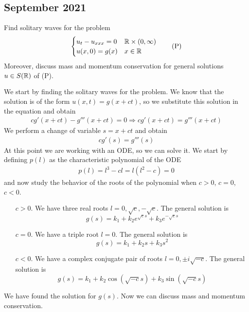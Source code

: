 \newpage
\subsection{September 2021}
\begin{exercise}
    Find solitary waves for the problem
    \[
        \begin{cases}
            u_t - u_{xxx} = 0 & \mathbb{R} \times (0, \infty) \\
            u(x, 0) = g(x)    & x \in \mathbb{R}
        \end{cases}
        \tag*{(P)}
    \]
    Moreover, discuss mass and momentum conservation for general solutions \(u \in
    S(\mathbb{R})\) of (P).
\end{exercise}
We start by finding the solitary waves for the problem. We know that the solution is of the form \(u(x,t) = g(x + ct)\), so we substitute this solution in the equation and obtain
\[
    \begin{split}
        cg'(x+ct) - g'''(x+ct) = 0 \Rightarrow cg'(x+ct) = g'''(x+ct)
    \end{split}
\]
We perform a change of variable \(s = x + ct\) and obtain
\[
    \begin{split}
        cg'(s) = g'''(s)
    \end{split}
\]
At this point we are working with an ODE, so we can solve it. We start by
defining \(p(l)\) as the characteristic polynomial of the ODE
\[
    \begin{split}
        p(l) = l^3 - c l = l(l^2 - c) = 0
    \end{split}
\]
and now study the behavior of the roots of the polynomial when \(c > 0\), \(c =
0\), \(c < 0\).
\begin{itemize}
    \item[\(c > 0\).] We have three real roots \(l = 0, \sqrt{c}, -\sqrt{c}\). The general solution is
          \[
              g(s) = k_1 + k_2 e^{\sqrt{c}s} + k_3 e^{-\sqrt{c}s}
          \]
    \item[\(c = 0\).] We have a triple root \(l = 0\). The general solution is
          \[
              g(s) = k_1 + k_2 s + k_3 s^2
          \]
    \item[\(c < 0\).] We have a complex conjugate pair of roots \(l = 0, \pm i \sqrt{-c}\). The general solution is
          \[
              g(s) = k_1 + k_2 \cos(\sqrt{-c}s) + k_3 \sin(\sqrt{-c}s)
          \]
\end{itemize}
We have found the solution for \(g(s)\). Now we can discuss mass and momentum conservation.

